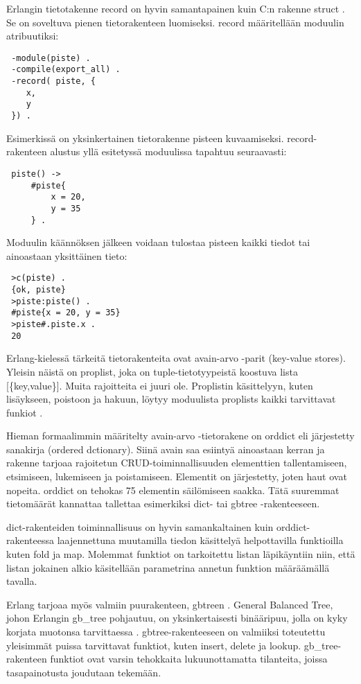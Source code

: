 \documentclass[11pt,oneside,a4paper]{article}
\begin{document}
Erlangin tietotakenne record on hyvin samantapainen kuin C:n rakenne struct
\cite{HEB13}. Se on soveltuva pienen tietorakenteen luomiseksi. record määritellään
moduulin atribuutiksi:
 \begin{verbatim}
 -module(piste) .
 -compile(export_all) .
 -record( piste, {
    x,
    y
 }) .
 \end{verbatim}
 Esimerkissä on yksinkertainen tietorakenne pisteen kuvaamiseksi. record-rakenteen
alustus yllä esitetyssä moduulissa tapahtuu seuraavasti: 
\begin{verbatim}
 piste() -> 
     #piste{
         x = 20,
         y = 35
     } .
 \end{verbatim}
Moduulin käännöksen jälkeen voidaan tulostaa pisteen kaikki tiedot tai ainoastaan
yksittäinen tieto:
\begin{verbatim}
 >c(piste) .
 {ok, piste}
 >piste:piste() .
 #piste{x = 20, y = 35}
 >piste#.piste.x .
 20
 \end{verbatim}


Erlang-kielessä tärkeitä tietorakenteita ovat avain-arvo -parit (key-value stores).
Yleisin näistä on proplist, joka on tuple-tietotyypeistä koostuva lista [\{key,value\}]. Muita
rajoitteita ei juuri ole. Proplistin käsittelyyn, kuten lisäykseen, poistoon ja hakuun,
löytyy moduulista proplists kaikki tarvittavat funkiot \cite{HEB13}. 
 
Hieman formaalimmin määritelty avain-arvo -tietorakene on orddict eli
järjestetty sanakirja (ordered dctionary). Siinä avain saa esiintyä ainoastaan
kerran ja rakenne tarjoaa rajoitetun CRUD-toiminnallisuuden elementtien
tallentamiseen, etsimiseen, lukemiseen ja poistamiseen. Elementit on
järjestetty, joten haut ovat nopeita\cite{HEB13}. orddict on tehokas 75
elementin säilömiseen saakka. Tätä suuremmat tietomäärät kannattaa tallettaa
esimerkiksi dict- tai gb\textunderscore tree -rakenteeseen. 
 
dict-rakenteiden toiminnallisuus on hyvin samankaltainen kuin orddict-rakenteessa laajennettuna muutamilla
tiedon käsittelyä helpottavilla funktioilla kuten fold ja map. Molemmat
funktiot
on tarkoitettu listan läpikäyntiin niin, että listan jokainen alkio
käsitellään parametrina annetun funktion määräämällä tavalla. 	
 
Erlang tarjoaa myös valmiin puurakenteen, gb\textunderscore treen \cite{HEB13}. General Balanced Tree, johon Erlangin gb\_tree pohjautuu, on yksinkertaisesti
binääripuu, jolla on
kyky korjata muotonsa tarvittaessa \cite{AND13}. 
gb\textunderscore tree-rakenteeseen on valmiiksi toteutettu
yleisimmät puissa tarvittavat funktiot, kuten insert, delete ja lookup. gb\_tree-rakenteen funktiot ovat varsin tehokkaita lukuunottamatta tilanteita, joissa tasapainotusta
joudutaan tekemään. 
 
\end{document}
